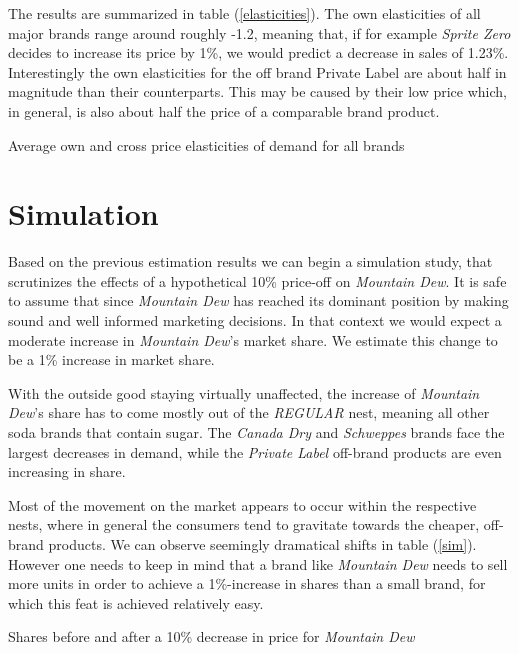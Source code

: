 \documentclass[12pt]{article}
\begin{document}
The results are summarized in table (\ref{elasticities}). The own elasticities of all major brands range around roughly -1.2, meaning that, if for example \textit{Sprite Zero} decides to increase its price by 1\%, we would predict a decrease in sales of 1.23\%. Interestingly the own elasticities for the off brand Private Label are about half in magnitude than their counterparts. This may be caused by their low price which, in general, is also about half the price of a comparable brand product. 

\begin{landscape}
\thispagestyle{empty}
\begin{table}
\scriptsize
\centering
\caption{Average own and cross price elasticities of demand for all brands}
\label{elasticities}

\end{table}
\end{landscape}


\section{Simulation}

Based on the previous estimation results we can begin a simulation study, that scrutinizes the effects of a hypothetical 10\% price-off on \textit{Mountain Dew}. It is safe to assume that since \textit{Mountain Dew} has reached its dominant position by making sound and well informed marketing decisions. In that context we would expect a moderate increase in \textit{Mountain Dew}'s market share. We estimate this change to be a 1\% increase in market share.

With the outside good staying virtually unaffected, the increase of \textit{Mountain Dew}'s share has to come mostly out of the \textit{REGULAR} nest, meaning all other soda brands that contain sugar. The \textit{Canada Dry} and \textit{Schweppes} brands face the largest decreases in demand, while the \textit{Private Label} off-brand products are even increasing in share. 

Most of the movement on the market appears to occur within the respective nests, where in general the consumers tend to gravitate towards the cheaper, off-brand products. We can observe seemingly dramatical shifts in table (\ref{sim}). However one needs to keep in mind that a brand like \textit{Mountain Dew} needs to sell more units in order to achieve a 1\%-increase in shares than a small brand, for which this feat is achieved relatively easy.

\begin{table}
\centering
\scriptsize
\caption{Shares before and after a 10\% decrease in price for \textit{Mountain Dew}}
\label{sim}

\end{table}


\end{document}
